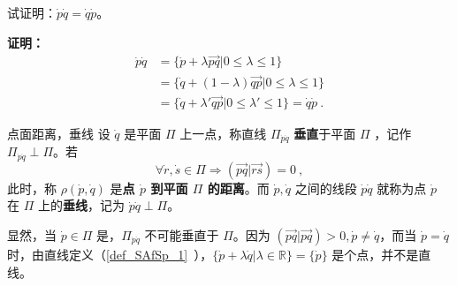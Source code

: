 \begin{example}{}
试证明：$\dot p\dot q=\dot q\dot p$。

\textbf{证明：}
\begin{equation}
\begin{aligned}
\dot p\dot q&=\{\dot p+\lambda\overrightarrow{pq}|0\leq\lambda\leq1\}\\
&=\{\dot q+(1-\lambda)\overrightarrow{qp}|0\leq\lambda\leq1\}\\
&=\{\dot q+\lambda'\overrightarrow{qp}|0\leq\lambda'\leq1\}=\dot q\dot p~.
\end{aligned}
\end{equation}
\end{example}
\begin{definition}{点面距离，垂线}
设 $\dot q$ 是平面 $\Pi$ 上一点，称直线 $\Pi_{\dot p\dot q}$ \textbf{垂直}于平面 $\Pi$ ，记作 $\Pi_{\dot p\dot q}\perp\Pi$。若
\begin{equation}
\forall \dot r,\dot s\in\Pi\Rightarrow (\overrightarrow{pq}|\overrightarrow{rs})=0~,
\end{equation}
此时，称 $\rho(\dot p,\dot q)$ 是\textbf{点 $\dot p$ 到平面 $\Pi$ 的距离}。而 $\dot p,\dot q$ 之间的线段 $\dot p\dot q$ 就称为点 $\dot p$ 在 $\Pi$ 上的\textbf{垂线}，记为 $\dot p\dot q\perp\Pi$。
\end{definition}
显然，当 $\dot p\in\Pi$ 是，$\Pi_{\dot p\dot q}$ 不可能垂直于 $\Pi$。因为 $(\overrightarrow{pq}|\overrightarrow{pq})>0,\dot p\neq \dot q$，而当 $\dot p=\dot q$ 时，由直线定义（\autoref{def_SAfSp_1}~），$\{\dot p+\lambda\dot q|\lambda\in \mathbb R\}=\{\dot p\}$ 是个点，并不是直线。
